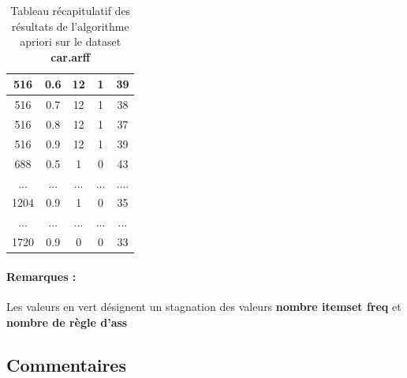 \begin{table}[H]
\begin{tabular}{|c|c|c|c|c|}
					516             & 0.6              & 12                           & 1                              & 39             \\ \hline
					516             & 0.7              & 12                           & 1                              & 38             \\ \hline
					516             & 0.8              & 12                           & 1                              & 37             \\ \hline
					516             & 0.9              & 12                           & 1                              & 39             \\ \hline
					688             & 0.5              & 1                            & 0                              & 43             \\ \hline
					\rowcolor[HTML]{9AFF99} 
					...             & ...              & ...                          & ...                            & ....           \\ \hline
					1204            & 0.9              & 1                            & 0                              & 35             \\ \hline
					\rowcolor[HTML]{9AFF99} 
					...             & ...              & ...                          & ...                            & ...            \\ \hline
					1720            & 0.9              & 0                            & 0                              & 33             \\ \hline
				\end{tabular}
				\caption{Tableau récapitulatif des résultats de l'algorithme apriori sur le dataset \textbf{car.arff}}
				\label{my-label}
			\end{table}
			\paragraph{Remarques :} Les valeurs en vert désignent un stagnation des valeurs \textbf{nombre itemset freq} et \textbf{nombre de règle d'ass}
		\subsection{Commentaires}
